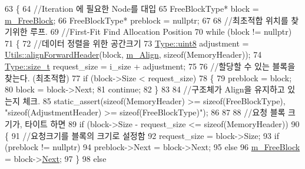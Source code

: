 \begin{DoxyCode}
63 \{
64     \textcolor{comment}{//Iteration 에 필요한 Node를 대입}
65     FreeBlockType* block = \hyperlink{class_comet_engine_1_1_core_1_1_memory_1_1_free_list_allocator_a9e6f8b10d6e94738d154d9f7c72d2538}{m\_FreeBlock};
66     FreeBlockType* preblock = \textcolor{keyword}{nullptr};
67 
68     \textcolor{comment}{//최초적합 위치를 찾기위한 루프.}
69     \textcolor{comment}{//First-Fit Find Allocation Position}
70     \textcolor{keywordflow}{while} (block != \textcolor{keyword}{nullptr})
71     \{
72         \textcolor{comment}{//데이터 정렬을 위한 공간크기}
73         \hyperlink{namespace_comet_engine_1_1_type_a1b09856a6463f2bcc4bd8ff0e4e3ee0f}{Type::uint8} adjustment = \hyperlink{namespace_comet_engine_1_1_core_1_1_memory_1_1_utils_a57bbceefc56fa0e2ec1e472d85ce5e19}{Utils::alignForwardHeader}(block, 
      \hyperlink{class_comet_engine_1_1_core_1_1_memory_1_1_base_allocator_a01f973630e3c1ac98b9defda193793b8}{m\_Align}, \textcolor{keyword}{sizeof}(MemoryHeader));
74         \hyperlink{namespace_comet_engine_1_1_type_a7c94ea6f8948649f8d181ae55911eeaf}{Type::size\_t} request\_size = i\_size + adjustment;
75         
76         \textcolor{comment}{//할당할 수 있는 블록을 찾는다. (최초적합)}
77         \textcolor{keywordflow}{if} (block->Size < request\_size)
78         \{
79             preblock = block;
80             block = block->Next;
81             \textcolor{keywordflow}{continue};
82         \}
83         
84         \textcolor{comment}{//구조체가 Align을 유지하고 있는지 체크.}
85         static\_assert(\textcolor{keyword}{sizeof}(MemoryHeader) >= \textcolor{keyword}{sizeof}(FreeBlockType), \textcolor{stringliteral}{"sizeof(AdjustmentHeader) >=
       sizeof(FreeBlockType)"});
86 
87 
88         \textcolor{comment}{//요청 블록 크기가, 타이트 하면}
89         \textcolor{keywordflow}{if} (block->Size - request\_size <= \textcolor{keyword}{sizeof}(MemoryHeader))
90         \{
91             \textcolor{comment}{//요청크기를 블록의 크기로 설정함}
92             request\_size = block->Size;
93             \textcolor{keywordflow}{if} (preblock != \textcolor{keyword}{nullptr})
94                 preblock->Next = block->Next;
95             \textcolor{keywordflow}{else}
96                 \hyperlink{class_comet_engine_1_1_core_1_1_memory_1_1_free_list_allocator_a9e6f8b10d6e94738d154d9f7c72d2538}{m\_FreeBlock} = block->\hyperlink{struct_comet_engine_1_1_core_1_1_memory_1_1_free_list_allocator_1_1_free_block_type_a85617a85510a3465dbae6a061308aef7}{Next};
97         \}
98         \textcolor{keywordflow}{else}

\end{DoxyCode}
